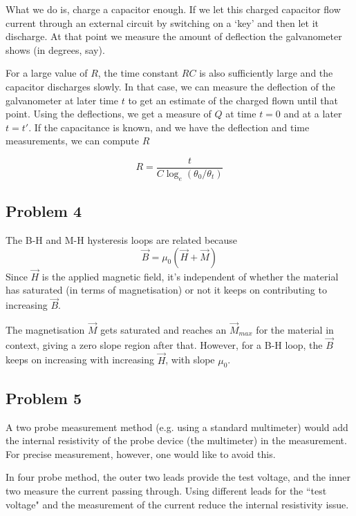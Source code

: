 \documentclass[11pt]{article}
\begin{document}
	What we do is, charge a capacitor enough. If we let this charged capacitor flow current through an external circuit by switching on a `key' and then let it discharge. At that point we measure the amount of deflection the galvanometer shows (in degrees, say).
	
	For a large value of $R$, the time constant $RC$ is also sufficiently large and the capacitor discharges slowly. In that case, we can measure the deflection of the galvanometer at later time $t$ to get an estimate of the charged flown until that point. Using the deflections, we get a measure of $Q$ at time $t=0$ and at a later $t=t'$. If the capacitance is known, and we have the deflection and time measurements, we can compute $R$
	
	\[ R = \frac{t}{C\log_e (\theta_0/\theta_t)}\] 
	
	
	\subsection*{Problem 4}
	The B-H and M-H hysteresis loops are related because \[ \vec{B} = \mu_0(\vec{H} + \vec{M})\]
	Since $\vec{H}$ is the applied magnetic field, it's independent of whether the material has saturated (in terms of magnetisation) or not \textemdash it keeps on contributing to increasing $\vec{B}$.
	
	The magnetisation $\vec{M}$ gets saturated and reaches an $\vec{M}_{max}$ for the material in context, giving a zero slope region after that. However, for a B-H loop, the $\vec{B}$ keeps on increasing with increasing $\vec{H}$, with slope $\mu_0$.
	
	\subsection*{Problem 5}
	
	A two probe measurement method (e.g. using a standard multimeter) would add the internal resistivity of the probe device (the multimeter) in the measurement. For precise measurement, however, one would like to avoid this.
	
	In four probe method, the outer two leads provide the test voltage, and the inner two measure the current passing through. Using different leads for the ``test voltage" and the measurement of the current reduce the internal resistivity issue.

	
\end{document}
